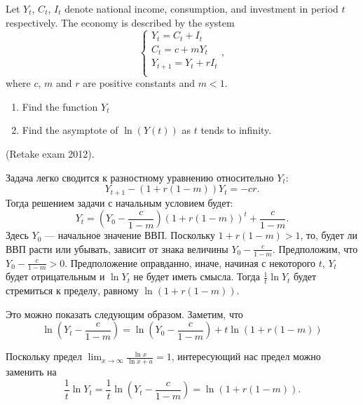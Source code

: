 \begin{problem}
 Let $Y_t$, $C_t$, $I_t$ denote national income, consumption, and investment in period $t$ respectively. The economy is described by the system
\begin{equation}
\begin{cases}
Y_t=C_t+I_t\\
C_t=c+mY_t\\
Y_{t+1}=Y_{t}+rI_t \\
\end{cases},
\end{equation}
where $c$, $m$ and $r$ are positive constants and $m<1$.
\begin{enumerate}
\item Find the function $Y_t$
\item Find the asymptote of $\ln(Y(t))$ as $t$ tends to infinity.
\end{enumerate}
(Retake exam 2012).


\begin{sol}
Задача легко сводится к разностному уравнению относительно   $Y_t$:
\[
Y_{t+1}-(1+r(1-m))Y_t=-cr.
\]
Тогда решением задачи с начальным условием будет:
\[
Y_t=\left(  Y_0-\frac{c}{1-m} \right) (1+r(1-m))^t + \frac{c}{1-m} .
\]
Здесь   $Y_0$ --- начальное значение ВВП. Поскольку  $1+r(1-m)>1$, то, будет ли ВВП расти или убывать, зависит от знака величины $Y_0-\frac{c}{1-m}$. Предположим, что $Y_0-\frac{c}{1-m}>0$. Предположение оправданно, иначе, начиная с некоторого $t$, $Y_t$ будет отрицательным и $\ln Y_t$  не будет иметь смысла.  Тогда  $\frac{1}{t}\ln Y_t$  будет стремиться к пределу, равному  $\ln (1+r(1-m))$.

Это можно показать следующим образом. Заметим, что
\[
\ln \left( Y_t - \frac{c}{1-m} \right) = \ln \left(  Y_0-\frac{c}{1-m} \right) +t \ln (1+r(1-m))
\]

Поскольку предел $\lim_{x\to\infty} \frac{\ln x}{\ln x+a}=1$, интересующий нас предел можно заменить на
\[
\frac{1}{t}\ln Y_t=\frac{1}{t} \ln \left( Y_t - \frac{c}{1-m} \right)=\ln (1+r(1-m)).
\]

\end{sol}
\end{problem}



